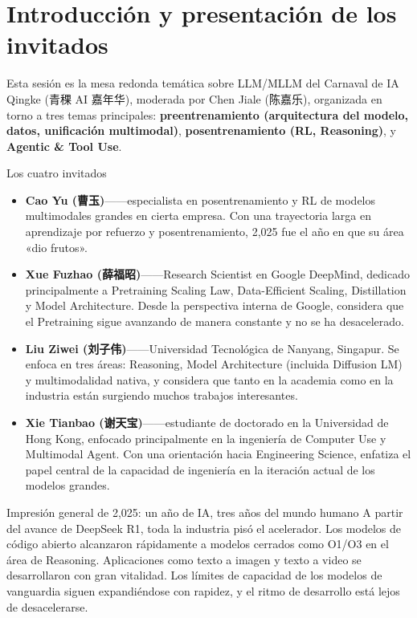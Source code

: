 \section{Introducción y presentación de los invitados}

Esta sesión es la mesa redonda temática sobre LLM/MLLM del Carnaval de IA Qingke (青稞 AI 嘉年华), moderada por Chen Jiale (陈嘉乐), organizada en torno a tres temas principales: \textbf{preentrenamiento (arquitectura del modelo, datos, unificación multimodal)}, \textbf{posentrenamiento (RL, Reasoning)}, y \textbf{Agentic \& Tool Use}.

\begin{knowledgebox}{Los cuatro invitados}
\begin{itemize}
  \item \textbf{Cao Yu (曹玉)}——especialista en posentrenamiento y RL de modelos multimodales grandes en cierta empresa. Con una trayectoria larga en aprendizaje por refuerzo y posentrenamiento, 2,025 fue el año en que su área «dio frutos».
  \item \textbf{Xue Fuzhao (薛福昭)}——Research Scientist en Google DeepMind, dedicado principalmente a Pretraining Scaling Law, Data-Efficient Scaling, Distillation y Model Architecture. Desde la perspectiva interna de Google, considera que el Pretraining sigue avanzando de manera constante y no se ha desacelerado.
  \item \textbf{Liu Ziwei (刘子伟)}——Universidad Tecnológica de Nanyang, Singapur. Se enfoca en tres áreas: Reasoning, Model Architecture (incluida Diffusion LM) y multimodalidad nativa, y considera que tanto en la academia como en la industria están surgiendo muchos trabajos interesantes.
  \item \textbf{Xie Tianbao (谢天宝)}——estudiante de doctorado en la Universidad de Hong Kong, enfocado principalmente en la ingeniería de Computer Use y Multimodal Agent. Con una orientación hacia Engineering Science, enfatiza el papel central de la capacidad de ingeniería en la iteración actual de los modelos grandes.
\end{itemize}
\end{knowledgebox}

\begin{importantbox}{Impresión general de 2,025: un año de IA, tres años del mundo humano}
A partir del avance de DeepSeek R1, toda la industria pisó el acelerador. Los modelos de código abierto alcanzaron rápidamente a modelos cerrados como O1/O3 en el área de Reasoning. Aplicaciones como texto a imagen y texto a video se desarrollaron con gran vitalidad. Los límites de capacidad de los modelos de vanguardia siguen expandiéndose con rapidez, y el ritmo de desarrollo está lejos de desacelerarse.
\end{importantbox}

